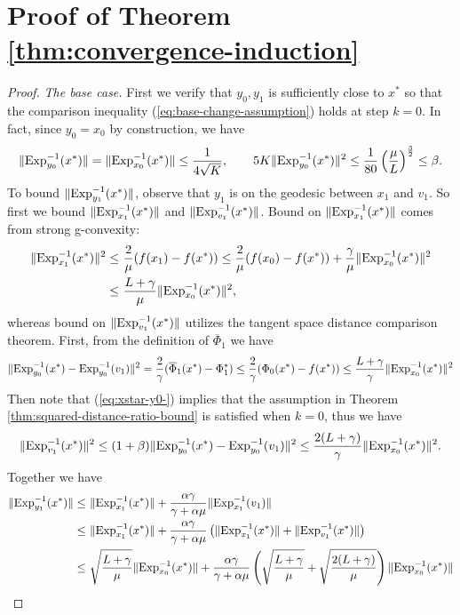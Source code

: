 \section{Proof of Theorem \ref{thm:convergence-induction}} \label{prf:convergence-induction}
\begin{proof} 
	\emph{The base case.} First we verify that $y_0, y_1$ is sufficiently close to $x^*$ so that the comparison inequality (\ref{eq:base-change-assumption}) holds at step $k=0$. In fact, since $y_0=x_0$ by construction, we have 
	\begin{equation} \label{eq:xstar-y0-}
	\|\mathrm{Exp}_{y_0}^{-1}(x^*)\| =\|\mathrm{Exp}_{x_0}^{-1}(x^*)\| \le  \frac{1}{4\sqrt{K}}, \qquad 5K\|\mathrm{Exp}_{y_0}^{-1}(x^*)\|^2 \le \frac{1}{80}\left(\frac{\mu}{L}\right)^{\frac{3}{2}} \le  \beta.
	\end{equation}
	To bound $\|\mathrm{Exp}_{y_1}^{-1}(x^*)\|$, observe that $y_1$ is on the geodesic between $x_1$ and $v_1$. So first we bound $\|\mathrm{Exp}_{x_1}^{-1}(x^*)\|$ and $\|\mathrm{Exp}_{v_1}^{-1}(x^*)\|$. Bound on $\|\mathrm{Exp}_{x_1}^{-1}(x^*)\|$ comes from strong g-convexity:
	\begin{align*}
	\|\mathrm{Exp}_{x_1}^{-1}(x^*)\|^2\le &~ \frac{2}{\mu}(f(x_1)-f(x^*))\le \frac{2}{\mu}(f(x_0)-f(x^*))+\frac{\gamma}{\mu}\|\mathrm{Exp}_{x_0}^{-1}(x^*)\|^2 \\
	\le &~ \frac{L+\gamma}{\mu}\|\mathrm{Exp}_{x_0}^{-1}(x^*)\|^2, 
	\end{align*}
	whereas bound on $\|\mathrm{Exp}_{v_1}^{-1}(x^*)\|$ utilizes the tangent space distance comparison theorem. First, from the definition of $\overline{\Phi}_1$ we have
	$$\|\mathrm{Exp}_{y_0}^{-1}(x^*)-\mathrm{Exp}_{y_0}^{-1}(v_1)\|^2 = \frac{2}{\gamma}(\overline{\Phi}_1(x^*)-\Phi_1^*)\le \frac{2}{\gamma}(\Phi_0(x^*)-f(x^*))\le \frac{L+\gamma}{\gamma}\|\mathrm{Exp}_{x_0}^{-1}(x^*)\|^2$$
	Then note that (\ref{eq:xstar-y0-}) implies that the assumption in Theorem \ref{thm:squared-distance-ratio-bound} is satisfied when $k=0$, thus we have
	$$\|\mathrm{Exp}_{v_1}^{-1}(x^*)\|^2\le  (1+\beta)\|\mathrm{Exp}_{y_0}^{-1}(x^*)-\mathrm{Exp}_{y_0}^{-1}(v_1)\|^2\le \frac{2(L+\gamma)}{\gamma}\|\mathrm{Exp}_{x_0}^{-1}(x^*)\|^2.$$
	Together we have 
	\begin{align}
	\nonumber\|\Exp_{y_1}^{-1}(x^*)\|\le ~& \|\Exp_{x_1}^{-1}(x^*)\| + \frac{\alpha\gamma}{\gamma+\alpha\mu}\|\Exp_{x_1}^{-1}(v_1)\|\\  \nonumber\le ~& \|\Exp_{x_1}^{-1}(x^*)\| + \frac{\alpha\gamma}{\gamma+\alpha\mu}\left(\|\Exp_{x_1}^{-1}(x^*)\| + \|\Exp_{v_1}^{-1}(x^*)\|\right) \\
	\nonumber\le ~& \sqrt{\frac{L+\gamma}{\mu}}\|\Exp_{x_0}^{-1}(x^*)\| + \frac{\alpha\gamma}{\gamma+\alpha\mu}\left(\sqrt{\frac{L+\gamma}{\mu}}+\sqrt{\frac{2(L+\gamma)}{\mu}}\right)\|\Exp_{x_0}^{-1}(x^*)\| \\

\end{align}
\end{proof}
